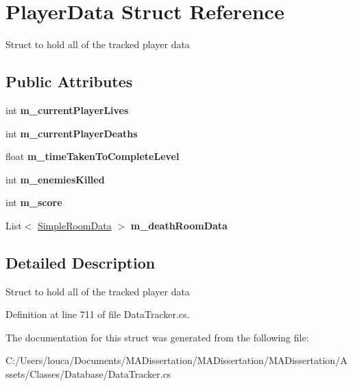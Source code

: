 \hypertarget{struct_player_data}{}\section{Player\+Data Struct Reference}
\label{struct_player_data}


Struct to hold all of the tracked player data  


\subsection*{Public Attributes}
\begin{DoxyCompactItemize}
\item 
\mbox{\label{struct_player_data_a9278645d46293fc45a6c3ec8f9ea3212}} 
int {\bfseries m\+\_\+current\+Player\+Lives}
\item 
\mbox{\label{struct_player_data_aaed7defb7fa33e61a7da04468844232a}} 
int {\bfseries m\+\_\+current\+Player\+Deaths}
\item 
\mbox{\label{struct_player_data_a61b5b35e90b935fa7a6f7280a6c53d8a}} 
float {\bfseries m\+\_\+time\+Taken\+To\+Complete\+Level}
\item 
\mbox{\label{struct_player_data_a3b341a1ef8cb96c2570dbf08bb6bed4c}} 
int {\bfseries m\+\_\+enemies\+Killed}
\item 
\mbox{\label{struct_player_data_a95b6e06eada9fc4900b00d35bef4b91c}} 
int {\bfseries m\+\_\+score}
\item 
\mbox{\label{struct_player_data_a9f54dd68b8dc3c4d6f64e99e21b5ae9d}} 
List$<$ \mbox{\hyperlink{struct_simple_room_data}{Simple\+Room\+Data}} $>$ {\bfseries m\+\_\+death\+Room\+Data}
\end{DoxyCompactItemize}


\subsection{Detailed Description}
Struct to hold all of the tracked player data 



Definition at line 711 of file Data\+Tracker.\+cs.



The documentation for this struct was generated from the following file\+:\begin{DoxyCompactItemize}
\item 
C\+:/\+Users/louca/\+Documents/\+M\+A\+Dissertation/\+M\+A\+Dissertation/\+M\+A\+Dissertation/\+Assets/\+Classes/\+Database/Data\+Tracker.\+cs\end{DoxyCompactItemize}
